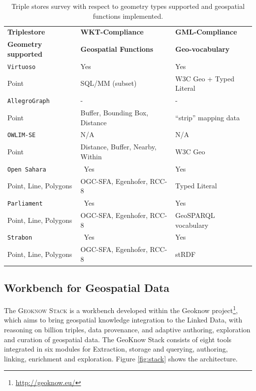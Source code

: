 \begin{table}[ht!bp]
  \caption{Triple stores survey with respect to geometry types supported and geospatial functions implemented.}
  \label{tab:triplestore}
  \centering
  \begin{tabular}{lll}
    \toprule
    \textbf{Triplestore} & \textbf{WKT-Compliance } &  \textbf{GML-Compliance } \\
    \textbf{Geometry supported} & \textbf{Geospatial Functions} &  \textbf{Geo-vocabulary} \\
    \toprule
    \texttt{Virtuoso} & Yes & Yes \\
    Point & SQL/MM (subset) & W3C Geo + Typed Literal \\
    \midrule
    \texttt{AllegroGraph} & \-- & \-- \\
    Point & Buffer, Bounding Box, Distance & ``strip'' mapping data \\
    \midrule
    \texttt{OWLIM-SE} & N/A & N/A \\
    Point & Distance, Buffer, Nearby, Within & W3C Geo \\
    \midrule
    \texttt{Open Sahara} & \ Yes & Yes \\
    Point, Line, Polygons & OGC-SFA, Egenhofer, RCC-8 & Typed Literal \\
    \midrule
    \texttt{Parliament} & \ Yes & Yes \\
    Point, Line, Polygons & OGC-SFA, Egenhofer, RCC-8 &  GeoSPARQL vocabulary\\
    \midrule
    \texttt{Strabon} & \ Yes & Yes \\
    Point, Line, Polygons & OGC-SFA, Egenhofer, RCC-8 &  stRDF\\
    \bottomrule
  \end{tabular}
\end{table}


\subsection{Workbench for Geospatial Data}
\label{sec:geoknow}
The \textsc{Geoknow Stack} is a workbench developed within the Geoknow project\footnote{\url{http://geoknow.eu/}}, which aims to bring geospatial knowledge integration to the Linked Data, with reasoning on billion triples, data provenance, and adaptive authoring, exploration and curation of geospatial data. The GeoKnow Stack consists of eight tools integrated in six modules for Extraction, storage and querying, authoring, linking, enrichment and exploration. Figure \ref{fig:stack} shows the architecture.

